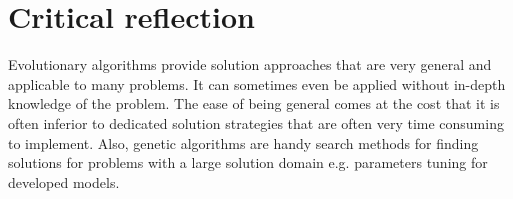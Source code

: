 \documentclass[a4paper,10pt]{article}
\begin{document}
\section{Critical reflection}

Evolutionary algorithms provide solution approaches that are very general and applicable to many problems. It can sometimes even be applied without in-depth knowledge of the problem. The ease of being general comes at the cost that it is often inferior to dedicated solution strategies that are often very time consuming to implement. Also, genetic algorithms are handy search methods for finding solutions for problems with a large solution domain e.g. parameters tuning for developed models.  





\end{document}
